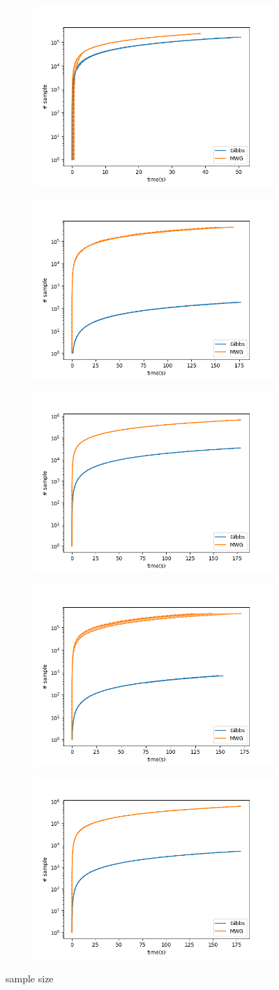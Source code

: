 \begin{figure}[h]
    \centering
    \begin{subfigure}
    	\centering
        \includegraphics[width=0.3\linewidth]{../../plots/SampleTime_M2_N50_NMCMC1_seed0_diffind2.png}
    \end{subfigure}
    \begin{subfigure}
        \centering
    	\includegraphics[width=0.3\linewidth]{../../plots/SampleTime_M2_N20000_NMCMC3_seed0_diffind2.png}
	\end{subfigure}
	\begin{subfigure}
	    \centering
    	\includegraphics[width=0.3\linewidth]{../../plots/SampleTime_M3_N100_NMCMC3_seed0_diffind2.png}
	\end{subfigure}
	\begin{subfigure}
	    \centering
    	\includegraphics[width=0.3\linewidth]{../../plots/SampleTime_M4_N100_NMCMC3_seed0_diffind2.png}
	\end{subfigure}
	\begin{subfigure}
	    \centering
    	\includegraphics[width=0.3\linewidth]{../../plots/SampleTime_M4_N60_NMCMC3_seed0_diffind2.png}
	\end{subfigure}
	\caption{sample size}
\end{figure}

